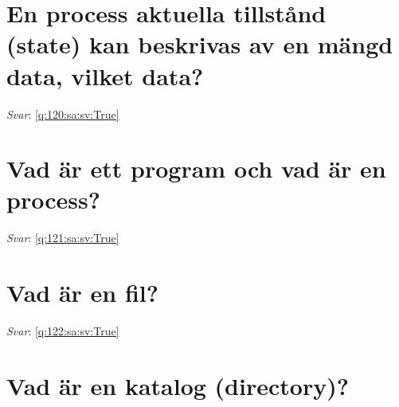 \documentclass[a4paper,11pt,oneside]{book}
\begin{document}
\begin{sloppypar}
\section{En process aktuella tillst\r{a}nd (state) kan beskrivas av en m\"angd data, vilket data?}

\label{q:120:sa:sv:False}

\vspace{2cm}

\noindent\makebox[\textwidth]{\hrulefill}

\vspace{1cm}

\textit{Svar}: \autoref{q:120:sa:sv:True}



\section{Vad \"ar ett program och vad \"ar en process?}

\label{q:121:sa:sv:False}

\vspace{2cm}

\noindent\makebox[\textwidth]{\hrulefill}

\vspace{1cm}

\textit{Svar}: \autoref{q:121:sa:sv:True}



\section{Vad \"ar en fil?}

\label{q:122:sa:sv:False}

\vspace{2cm}

\noindent\makebox[\textwidth]{\hrulefill}

\vspace{1cm}

\textit{Svar}: \autoref{q:122:sa:sv:True}



\section{Vad \"ar en katalog (directory)?}

\label{q:123:sa:sv:False}

\vspace{2cm}

\noindent\makebox[\textwidth]{\hrulefill}


\end{sloppypar}
\end{document}

